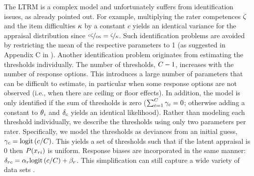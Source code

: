 \documentclass[a4paper,usenames,dvipsnames]{article}
\begin{document}
The LTRM is a complex model and unfortunately suffers from identification issues, as \AB{} already pointed out. For example, multiplying the rater competences $\zeta$ and the item difficulties $\kappa$ by a constant $c$ yields an identical variance for the appraisal distribution since $\nicefrac{c\zeta}{c\kappa} = \nicefrac{\zeta}{\kappa}$. Such identification problems are avoided by restricting the mean of the respective parameters to 1 (as suggested in Appendix C in \AB{}). Another identification problem originates from estimating the thresholds individually. The number of thresholds, $\Tncat-1$, increases with the number of response options. This introduces a large number of parameters that can be difficult to estimate, in particular when some response options are not observed (i.e., when there are ceiling or floor effects). In addition, the model is only identified if the sum of thresholds is zero ($\sum_{\Incat=1}^{\Tncat}\UnBiasedThreshold_\Incat = 0$; otherwise adding a constant to $\theta{}_i$ and $\delta_c$ yields an identical likelihood). Rather than modeling each threshold individually, we describe the thresholds using only two parameters per rater. Specifically, we model the thresholds as deviances from an initial guess, $\gamma_c = \text{logit}\left(c/C\right)$. This yields a set of thresholds such that if the latent appraisal is 0 then $P(x_{ri})$ is uniform. Response biases are incorporated in the same manner: $\delta_{rc} = \alpha_r\text{logit}\left(c/C\right) + \beta_r$. This simplification can still capture a wide variety of data sets \cite{Selker2019}.
\end{document}
